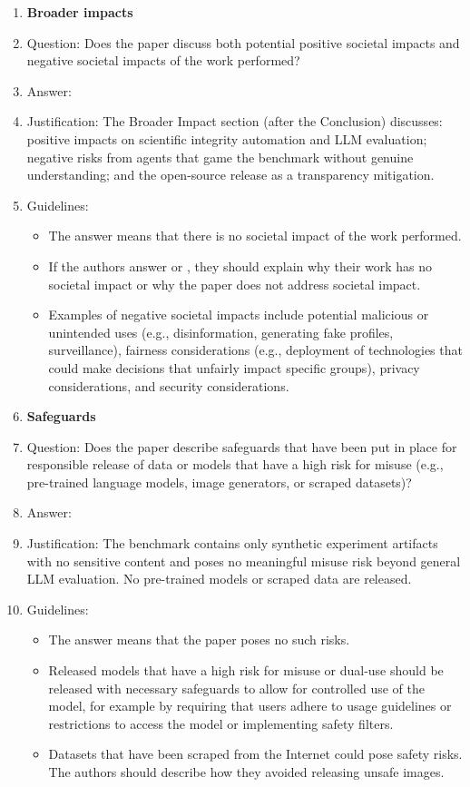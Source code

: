 \begin{enumerate}
\item {\bf Broader impacts}
    \item[] Question: Does the paper discuss both potential positive societal impacts and negative societal impacts of the work performed?
    \item[] Answer: \answerYes{}
    \item[] Justification: The Broader Impact section (after the Conclusion) discusses: positive impacts on scientific integrity automation and LLM evaluation; negative risks from agents that game the benchmark without genuine understanding; and the open-source release as a transparency mitigation.
    \item[] Guidelines: \begin{itemize}
        \item The answer \answerNA{} means that there is no societal impact of the work performed.
        \item If the authors answer \answerNA{} or \answerNo, they should explain why their work has no societal impact or why the paper does not address societal impact.
        \item Examples of negative societal impacts include potential malicious or unintended uses (e.g., disinformation, generating fake profiles, surveillance), fairness considerations (e.g., deployment of technologies that could make decisions that unfairly impact specific groups), privacy considerations, and security considerations.
    \end{itemize}

\item {\bf Safeguards}
    \item[] Question: Does the paper describe safeguards that have been put in place for responsible release of data or models that have a high risk for misuse (e.g., pre-trained language models, image generators, or scraped datasets)?
    \item[] Answer: \answerNA{}
    \item[] Justification: The benchmark contains only synthetic experiment artifacts with no sensitive content and poses no meaningful misuse risk beyond general LLM evaluation. No pre-trained models or scraped data are released.
    \item[] Guidelines: \begin{itemize}
        \item The answer \answerNA{} means that the paper poses no such risks.
        \item Released models that have a high risk for misuse or dual-use should be released with necessary safeguards to allow for controlled use of the model, for example by requiring that users adhere to usage guidelines or restrictions to access the model or implementing safety filters.
        \item Datasets that have been scraped from the Internet could pose safety risks. The authors should describe how they avoided releasing unsafe images.
    \end{itemize}


\end{enumerate}
